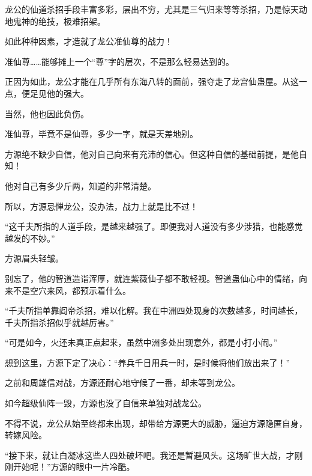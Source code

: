 \begin{this_body}
龙公的仙道杀招手段丰富多彩，层出不穷，尤其是三气归来等等杀招，乃是惊天动地鬼神的绝技，极难招架。

如此种种因素，才造就了龙公准仙尊的战力！

准仙尊……能够摊上一个“尊”字的层次，不是那么轻易达到的。

正因为如此，龙公才能在几乎所有东海八转的面前，强夺走了龙宫仙蛊屋。从这一点，便足见他的强大。

当然，他也因此负伤。

准仙尊，毕竟不是仙尊，多少一字，就是天差地别。

方源绝不缺少自信，他对自己向来有充沛的信心。但这种自信的基础前提，是他自知！

他对自己有多少斤两，知道的非常清楚。

所以，方源忌惮龙公，没办法，战力上就是比不过！

“这千夫所指的人道手段，是越来越强了。即便我对人道没有多少涉猎，也能感觉越发的不妙。”

方源眉头轻皱。

别忘了，他的智道造诣浑厚，就连紫薇仙子都不敢轻视。智道蛊仙心中的情绪，向来不是空穴来风，都预示着什么。

“千夫所指单靠阎帝杀招，难以化解。我在中洲四处现身的次数越多，时间越长，千夫所指杀招似乎就越厉害。”

“可是如今，火还未真正点起来，虽然中洲多处出现意外，都是小打小闹。”

想到这里，方源下定了决心：“养兵千日用兵一时，是时候将他们放出来了！”

之前和周雄信对战，方源还耐心地守候了一番，却未等到龙公。

如今超级仙阵一毁，方源也没了自信来单独对战龙公。

不得不说，龙公从始至终都未出现，却带给方源更大的威胁，逼迫方源隐匿自身，转嫁风险。

“接下来，就让白凝冰这些人四处破坏吧。我还是暂避风头。这场旷世大战，才刚刚开始呢！”方源的眼中一片冷酷。

\end{this_body}

